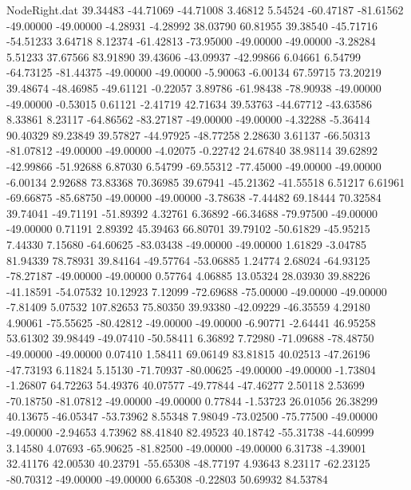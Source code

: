 \begin{filecontents}{NodeRight.dat}
  39.34483  -44.71069  -44.71008     3.46812    5.54524  -60.47187  -81.61562  -49.00000  -49.00000   -4.28931   -4.28992   38.03790   60.81955
  39.38540  -45.71716  -54.51233     3.64718    8.12374  -61.42813  -73.95000  -49.00000  -49.00000   -3.28284    5.51233   37.67566   83.91890
  39.43606  -43.09937  -42.99866     6.04661    6.54799  -64.73125  -81.44375  -49.00000  -49.00000   -5.90063   -6.00134   67.59715   73.20219
  39.48674  -48.46985  -49.61121    -0.22057    3.89786  -61.98438  -78.90938  -49.00000  -49.00000   -0.53015    0.61121   -2.41719   42.71634
  39.53763  -44.67712  -43.63586     8.33861    8.23117  -64.86562  -83.27187  -49.00000  -49.00000   -4.32288   -5.36414   90.40329   89.23849
  39.57827  -44.97925  -48.77258     2.28630    3.61137  -66.50313  -81.07812  -49.00000  -49.00000   -4.02075   -0.22742   24.67840   38.98114
  39.62892  -42.99866  -51.92688     6.87030    6.54799  -69.55312  -77.45000  -49.00000  -49.00000   -6.00134    2.92688   73.83368   70.36985
  39.67941  -45.21362  -41.55518     6.51217    6.61961  -69.66875  -85.68750  -49.00000  -49.00000   -3.78638   -7.44482   69.18444   70.32584
  39.74041  -49.71191  -51.89392     4.32761    6.36892  -66.34688  -79.97500  -49.00000  -49.00000    0.71191    2.89392   45.39463   66.80701
  39.79102  -50.61829  -45.95215     7.44330    7.15680  -64.60625  -83.03438  -49.00000  -49.00000    1.61829   -3.04785   81.94339   78.78931
  39.84164  -49.57764  -53.06885     1.24774    2.68024  -64.93125  -78.27187  -49.00000  -49.00000    0.57764    4.06885   13.05324   28.03930
  39.88226  -41.18591  -54.07532    10.12923    7.12099  -72.69688  -75.00000  -49.00000  -49.00000   -7.81409    5.07532  107.82653   75.80350
  39.93380  -42.09229  -46.35559     4.29180    4.90061  -75.55625  -80.42812  -49.00000  -49.00000   -6.90771   -2.64441   46.95258   53.61302
  39.98449  -49.07410  -50.58411     6.36892    7.72980  -71.09688  -78.48750  -49.00000  -49.00000    0.07410    1.58411   69.06149   83.81815
  40.02513  -47.26196  -47.73193     6.11824    5.15130  -71.70937  -80.00625  -49.00000  -49.00000   -1.73804   -1.26807   64.72263   54.49376
  40.07577  -49.77844  -47.46277     2.50118    2.53699  -70.18750  -81.07812  -49.00000  -49.00000    0.77844   -1.53723   26.01056   26.38299
  40.13675  -46.05347  -53.73962     8.55348    7.98049  -73.02500  -75.77500  -49.00000  -49.00000   -2.94653    4.73962   88.41840   82.49523
  40.18742  -55.31738  -44.60999     3.14580    4.07693  -65.90625  -81.82500  -49.00000  -49.00000    6.31738   -4.39001   32.41176   42.00530
  40.23791  -55.65308  -48.77197     4.93643    8.23117  -62.23125  -80.70312  -49.00000  -49.00000    6.65308   -0.22803   50.69932   84.53784

\end{filecontents}

